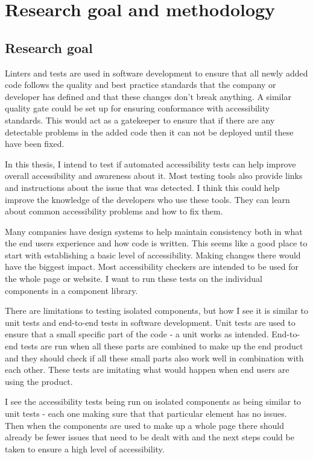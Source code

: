 \documentclass{master_thesis}
\begin{document}
\section{Research goal and methodology}
\subsection{Research goal}

Linters and tests are used in software development to ensure that all newly added code follows the quality and best practice standards that the company or developer has defined and that these changes don't break anything. A similar quality gate could be set up for ensuring conformance with accessibility standards. This would act as a gatekeeper to ensure that if there are any detectable problems in the added code then it can not be deployed until these have been fixed.

In this thesis, I intend to test if automated accessibility tests can help improve overall accessibility and awareness about it. Most testing tools also provide links and instructions about the issue that was detected. I think this could help improve the knowledge of the developers who use these tools. They can learn about common accessibility problems and how to fix them.

Many companies have design systems to help maintain consistency both in what the end users experience and how code is written. This seems like a good place to start with establishing a basic level of accessibility. Making changes there would have the biggest impact. Most accessibility checkers are intended to be used for the whole page or website. I want to run these tests on the individual components in a component library.

There are limitations to testing isolated components, but how I see it is similar to unit tests and end-to-end tests in software development. Unit tests are used to ensure that a small specific part of the code - a unit works as intended. End-to-end tests are run when all these parts are combined to make up the end product and they should check if all these small parts also work well in combination with each other. These tests are imitating what would happen when end users are using the product.

I see the accessibility tests being run on isolated components as being similar to unit tests - each one making sure that that particular element has no issues. Then when the components are used to make up a whole page there should already be fewer issues that need to be dealt with and the next steps could be taken to ensure a high level of accessibility.
\end{document}
